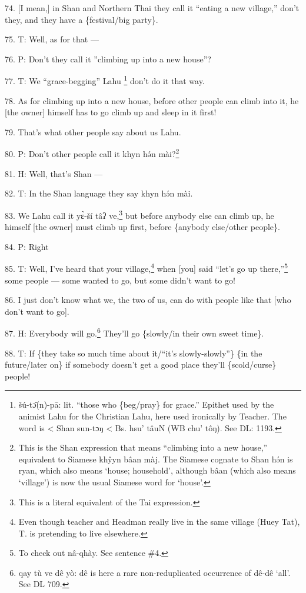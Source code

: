 74. [I mean,] in Shan and Northern Thai they call it ``eating a new village,''
don't they, and they have a \{festival/big party\}.

75. T: Well, as for that ---

76. P: Don't they call it ''climbing up into a new house''?

77. T: We ``grace-begging'' Lahu \footnote{šú-tɔ̂(n)-pā: lit. ``those who \{beg/pray\} for grace.'' Epithet used by the animist Lahu for the Christian Lahu, here used ironically by Teacher. The word is < Shan sun-tɔŋ < Bs. hsu' tâuN (WB chu' tôŋ). See DL: 1193.} don't do it that way.

78. As for climbing up into a new house, before other people can climb into it,
he [the owner] himself has to go climb up and sleep in it first!

79. That's what other people say about us Lahu.

80. P: Don't other people call it khyn hə́n mài?\footnote{This is the Shan expression that means ``climbing into a new house,'' equivalent to Siamese khŷyn bâan màj. The Siamese cognate to Shan hə́n is ryan, which also means `house; household', although bâan (which also means `village') is now the usual Siamese word for `house'.}

81. H: Well, that's Shan ---

82. T: In the Shan language they say khyn hə́n mài.

83. We Lahu call it yɛ̀-ší tâʔ ve,\footnote{This is a literal equivalent of the Tai expression.} but before anybody else can climb
up, he himself [the owner] must climb up first, before \{anybody else/other people\}.

84. P: Right

85. T: Well, I've heard that your village,\footnote{Even though teacher and Headman really live in the same village (Huey Tat), T. is pretending to live elsewhere.} when [you] said ``let's go up there,''\footnote{To check out nâ-qhày. See sentence \#4.}
some people --- some wanted to go, but some didn't want to go!

86. I just don't know what we, the two of us, can do with people like that [who
don't want to go].

87. H: Everybody will go.\footnote{qay tù ve dê yò: dê is here a rare non-reduplicated occurrence of dê-dê `all'. See DL 709.} They'll go \{slowly/in their own sweet time\}.

88. T: If \{they take so much time about it/``it's slowly-slowly''\} \{in the future/later
on\} if somebody doesn't get a good place they'll \{scold/curse\} people!

